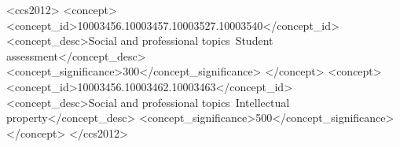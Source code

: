 \documentclass[manuscript,screen,sigconf]{acmart}
\begin{document}
\begin{CCSXML}
<ccs2012>
   <concept>
       <concept_id>10003456.10003457.10003527.10003540</concept_id>
       <concept_desc>Social and professional topics~Student assessment</concept_desc>
       <concept_significance>300</concept_significance>
       </concept>
   <concept>
       <concept_id>10003456.10003462.10003463</concept_id>
       <concept_desc>Social and professional topics~Intellectual property</concept_desc>
       <concept_significance>500</concept_significance>
       </concept>
 </ccs2012>
\end{CCSXML}




\newenvironment{myquote}%
  {\list{}{\leftmargin=0.1in\rightmargin=0.1in}\item[]}%
  {\endlist}

\maketitle

















\end{document}
